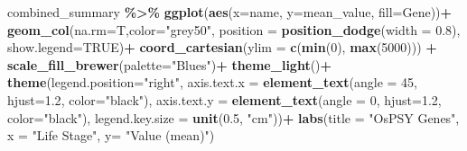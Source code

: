 \documentclass[
]{article}
\newenvironment{Shaded}{\begin{snugshade}}{\end{snugshade}}
\newcommand{\AttributeTok}[1]{\textcolor[rgb]{0.13,0.29,0.53}{#1}}
\newcommand{\ConstantTok}[1]{\textcolor[rgb]{0.56,0.35,0.01}{#1}}
\newcommand{\DecValTok}[1]{\textcolor[rgb]{0.00,0.00,0.81}{#1}}
\newcommand{\FloatTok}[1]{\textcolor[rgb]{0.00,0.00,0.81}{#1}}
\newcommand{\FunctionTok}[1]{\textcolor[rgb]{0.13,0.29,0.53}{\textbf{#1}}}
\newcommand{\NormalTok}[1]{#1}
\newcommand{\SpecialCharTok}[1]{\textcolor[rgb]{0.81,0.36,0.00}{\textbf{#1}}}
\newcommand{\StringTok}[1]{\textcolor[rgb]{0.31,0.60,0.02}{#1}}
\begin{document}
\begin{Shaded}
\begin{Highlighting}[]
\NormalTok{ combined\_summary }\SpecialCharTok{\%\textgreater{}\%} 
  \FunctionTok{ggplot}\NormalTok{(}\FunctionTok{aes}\NormalTok{(}\AttributeTok{x=}\NormalTok{name, }\AttributeTok{y=}\NormalTok{mean\_value, }\AttributeTok{fill=}\NormalTok{Gene))}\SpecialCharTok{+}
  \FunctionTok{geom\_col}\NormalTok{(}\AttributeTok{na.rm=}\NormalTok{T,}\AttributeTok{color=}\StringTok{"grey50"}\NormalTok{, }\AttributeTok{position =} \FunctionTok{position\_dodge}\NormalTok{(}\AttributeTok{width =} \FloatTok{0.8}\NormalTok{), }\AttributeTok{show.legend=}\ConstantTok{TRUE}\NormalTok{)}\SpecialCharTok{+}
  \FunctionTok{coord\_cartesian}\NormalTok{(}\AttributeTok{ylim =} \FunctionTok{c}\NormalTok{(}\FunctionTok{min}\NormalTok{(}\DecValTok{0}\NormalTok{), }\FunctionTok{max}\NormalTok{(}\DecValTok{5000}\NormalTok{))) }\SpecialCharTok{+}
  \FunctionTok{scale\_fill\_brewer}\NormalTok{(}\AttributeTok{palette=}\StringTok{"Blues"}\NormalTok{)}\SpecialCharTok{+}
  \FunctionTok{theme\_light}\NormalTok{()}\SpecialCharTok{+}
  \FunctionTok{theme}\NormalTok{(}\AttributeTok{legend.position=}\StringTok{"right"}\NormalTok{, }
        \AttributeTok{axis.text.x =} \FunctionTok{element\_text}\NormalTok{(}\AttributeTok{angle =} \DecValTok{45}\NormalTok{, }\AttributeTok{hjust=}\FloatTok{1.2}\NormalTok{, }\AttributeTok{color=}\StringTok{"black"}\NormalTok{), }
        \AttributeTok{axis.text.y =} \FunctionTok{element\_text}\NormalTok{(}\AttributeTok{angle =} \DecValTok{0}\NormalTok{, }\AttributeTok{hjust=}\FloatTok{1.2}\NormalTok{, }\AttributeTok{color=}\StringTok{"black"}\NormalTok{), }
        \AttributeTok{legend.key.size =} \FunctionTok{unit}\NormalTok{(}\FloatTok{0.5}\NormalTok{, }\StringTok{"cm"}\NormalTok{))}\SpecialCharTok{+}
  \FunctionTok{labs}\NormalTok{(}\AttributeTok{title =} \StringTok{"OsPSY Genes"}\NormalTok{,}
       \AttributeTok{x =} \StringTok{"Life Stage"}\NormalTok{,}
       \AttributeTok{y=} \StringTok{"Value (mean)"}\NormalTok{)}
\end{Highlighting}
\end{Shaded}
\end{document}
